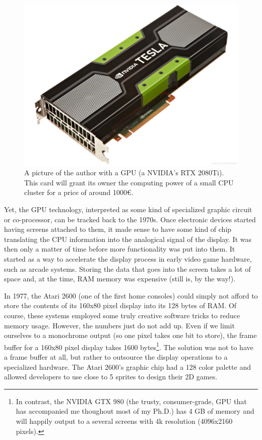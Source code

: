 \documentclass[ twoside,openright,titlepage,numbers=noenddot,%
headinclude,footinclude,cleardoublepage=empty,abstract=on,
BCOR=5mm,paper=a4,fontsize=11pt, dvipsnames
]{scrreprt}
\newcommand{\gpu}{\gls{GPU}\xspace}
\begin{document}
\begin{figure}
  \centering
  \includegraphics[width=\textwidth]{gpu_and_me}
  \caption{A picture of the author with a GPU (a NVIDIA's RTX 2080Ti). This card will grant its owner the computing power of a small CPU cluster for a price of around 1000€.}
  \label{fig:gpuandme}
\end{figure}

Yet, the \gpu technology, interpreted as some kind of specialized graphic circuit or co-processor, can be tracked back to the 1970s. Once electronic devices started having screens attached to them, it made sense to have some kind of chip translating the CPU information into the analogical signal of the display. It was then only a matter of time before more functionality was put into them. It started as a way to accelerate the display process in early video game hardware, such as arcade systems.
Storing the data that goes into the screen takes a lot of space and, at the time, RAM memory was expensive (still is, by the way!).

In 1977, the Atari 2600 (one of the first home consoles) could simply not afford to store the contents of its 160x80 pixel display into its 128 bytes of RAM. Of course, these systems employed some truly creative software tricks to reduce memory usage. However, the numbers just do not add up. Even if we limit ourselves to a monochrome output (so one pixel takes one bit to store), the frame buffer for a 160x80 pixel display takes 1600 bytes\footnote{In contrast, the NVIDIA GTX 980 (the trusty, consumer-grade, GPU that has accompanied me thoughout most of my Ph.D.) has 4 GB of memory and will happily output to a several screens with 4k resolution (4096x2160 pixels).}.
The solution was not to have a frame buffer at all, but rather to outsource the display operations to a specialized hardware. The Atari 2600's graphic chip had a 128 color palette and allowed developers to use close to 5 sprites to design their 2D games.
\end{document}
